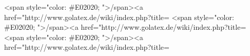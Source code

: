 {<span style="color: #E02020; ">\</span><a href="http://www.golatex.de/wiki/index.php?title=%
<span style="color: #E02020; ">\</span><a href="http://www.golatex.de/wiki/index.php?title=%
<span style="color: #E02020; ">\</span><a href="http://www.golatex.de/wiki/index.php?title=%
}
